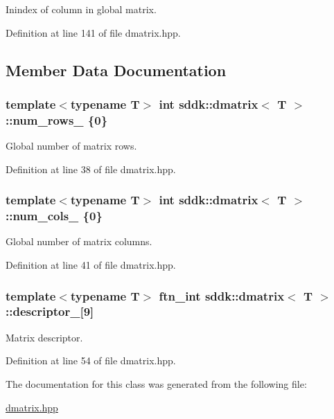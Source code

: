 Inindex of column in global matrix. 



Definition at line 141 of file dmatrix.\+hpp.



\subsection{Member Data Documentation}
\hypertarget{classsddk_1_1dmatrix_ada5ad5c79203f9db5863ff8a94785968}{}
\subsubsection[{num\+\_\+rows\+\_\+}]{\setlength{\rightskip}{0pt plus 5cm}template$<$typename T$>$ int {\bf sddk\+::dmatrix}$<$ T $>$\+::num\+\_\+rows\+\_\+ \{0\}\hspace{0.3cm}{\ttfamily [private]}}\label{classsddk_1_1dmatrix_ada5ad5c79203f9db5863ff8a94785968}


Global number of matrix rows. 



Definition at line 38 of file dmatrix.\+hpp.

\hypertarget{classsddk_1_1dmatrix_a6b7c813717810ff63c246504c67e1ab5}{}
\subsubsection[{num\+\_\+cols\+\_\+}]{\setlength{\rightskip}{0pt plus 5cm}template$<$typename T$>$ int {\bf sddk\+::dmatrix}$<$ T $>$\+::num\+\_\+cols\+\_\+ \{0\}\hspace{0.3cm}{\ttfamily [private]}}\label{classsddk_1_1dmatrix_a6b7c813717810ff63c246504c67e1ab5}


Global number of matrix columns. 



Definition at line 41 of file dmatrix.\+hpp.

\hypertarget{classsddk_1_1dmatrix_a8461e9f58455228fcda1403a3a945b85}{}
\subsubsection[{descriptor\+\_\+}]{\setlength{\rightskip}{0pt plus 5cm}template$<$typename T$>$ ftn\+\_\+int {\bf sddk\+::dmatrix}$<$ T $>$\+::descriptor\+\_\+\mbox{[}9\mbox{]}\hspace{0.3cm}{\ttfamily [private]}}\label{classsddk_1_1dmatrix_a8461e9f58455228fcda1403a3a945b85}


Matrix descriptor. 



Definition at line 54 of file dmatrix.\+hpp.



The documentation for this class was generated from the following file\+:\begin{DoxyCompactItemize}
\item 
\hyperlink{dmatrix_8hpp}{dmatrix.\+hpp}\end{DoxyCompactItemize}
